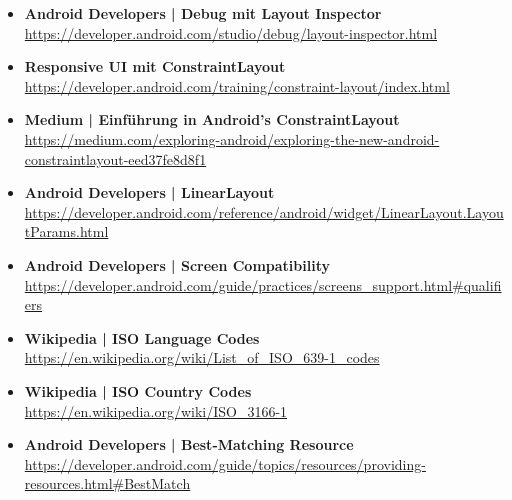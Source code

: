 \documentclass[a4paper]{article}
\begin{document}
{\begin{itemize}
		\item \textbf{Android Developers | Debug mit Layout Inspector}\\
		\href{https://developer.android.com/studio/debug/layout-inspector.html}
		{https://developer.android.com/studio/debug/layout-inspector.html}
		
		\item \textbf{Responsive UI mit ConstraintLayout}\\
		\href{https://developer.android.com/training/constraint-layout/index.html}
		{https://developer.android.com/training/constraint-layout/index.html}
		
		\item \textbf{Medium | Einführung in Android's ConstraintLayout}\\
		\href{https://medium.com/exploring-android/exploring-the-new-android-constraintlayout-eed37fe8d8f1}
		{https://medium.com/exploring-android/exploring-the-new-android-constraintlayout-eed37fe8d8f1}
		
		\item \textbf{Android Developers | LinearLayout}\\
		\href{https://developer.android.com/reference/android/widget/LinearLayout.LayoutParams.html}
		{https://developer.android.com/reference/android/widget/LinearLayout.LayoutParams.html}
		
		\item \textbf{Android Developers | Screen Compatibility}\\
		\href{https://developer.android.com/guide/practices/screens_support.html#qualifiers}
		{https://developer.android.com/guide/practices/screens\_support.html\#qualifiers}
		
		\item \textbf{Wikipedia | ISO Language Codes}\\
		\href{https://en.wikipedia.org/wiki/List_of_ISO_639-1_codes}
		{https://en.wikipedia.org/wiki/List\_of\_ISO\_639-1\_codes}
		
		\item \textbf{Wikipedia | ISO Country Codes}\\
		\href{https://en.wikipedia.org/wiki/ISO_3166-1}
		{https://en.wikipedia.org/wiki/ISO\_3166-1}
		
		\item \textbf{Android Developers | Best-Matching Resource}\\
		\href{https://developer.android.com/guide/topics/resources/providing-resources.html#BestMatch}
		{https://developer.android.com/guide/topics/resources/providing-resources.html\#BestMatch}
		

\end{itemize}}
\end{document}
